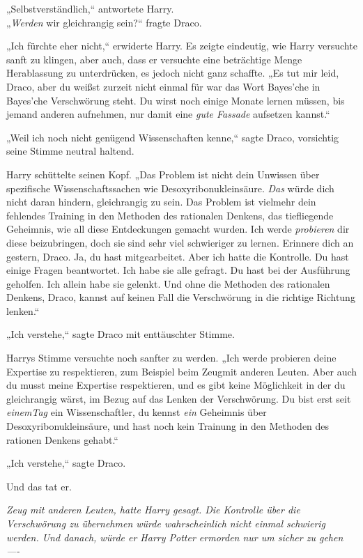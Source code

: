 {„Selbstverständlich,“ antwortete Harry.\\ „\emph{Werden} wir gleichrangig sein?“ fragte Draco.

„Ich fürchte eher nicht,“ erwiderte Harry. Es zeigte eindeutig, wie Harry versuchte sanft zu klingen, aber auch, dass er versuchte eine beträchtige Menge Herablassung zu unterdrücken, es jedoch nicht ganz schaffte. „Es tut mir leid, Draco, aber du weißst zurzeit nicht einmal für war das Wort Bayes'che in Bayes'che Verschwörung steht. Du wirst noch einige Monate lernen müssen, bis jemand anderen aufnehmen, nur damit eine \emph{gute Fassade} aufsetzen kannst.“

„Weil ich noch nicht genügend Wissenschaften kenne,“ sagte Draco, vorsichtig seine Stimme neutral haltend.

Harry schüttelte seinen Kopf. „Das Problem ist nicht dein Unwissen über spezifische Wissenschaftssachen wie Desoxyribonukleinsäure. \emph{Das} würde dich nicht daran hindern, gleichrangig zu sein. Das Problem ist vielmehr dein fehlendes Training in den Methoden des rationalen Denkens, das tiefliegende Geheimnis, wie all diese Entdeckungen gemacht wurden. Ich werde \emph{probieren} dir diese beizubringen, doch sie sind sehr viel schwieriger zu lernen. Erinnere dich an gestern, Draco. Ja, du hast mitgearbeitet. Aber ich hatte die Kontrolle. Du hast einige Fragen beantwortet. Ich habe sie alle gefragt. Du hast bei der Ausführung geholfen. Ich allein habe sie gelenkt. Und ohne die Methoden des rationalen Denkens, Draco, kannst auf keinen Fall die Verschwörung in die richtige Richtung lenken.“

„Ich verstehe,“ sagte Draco mit enttäuschter Stimme.

Harrys Stimme versuchte noch sanfter zu werden. „Ich werde probieren deine Expertise zu respektieren, zum Beispiel beim Zeugmit anderen Leuten. Aber auch du musst meine Expertise respektieren, und es gibt keine Möglichkeit in der du gleichrangig wärst, im Bezug auf das Lenken der Verschwörung. Du bist erst seit \emph{einemTag} ein Wissenschaftler, du kennst \emph{ein} Geheimnis über Desoxyribonukleinsäure, und hast noch kein Trainung in den Methoden des rationen Denkens gehabt.“

„Ich verstehe,“ sagte Draco.

Und das tat er.

\emph{Zeug mit anderen Leuten, hatte Harry gesagt. Die Kontrolle über die Verschwörung zu übernehmen würde wahrscheinlich nicht einmal schwierig werden. Und danach, würde er Harry Potter ermorden nur um sicher zu gehen ----}

}
